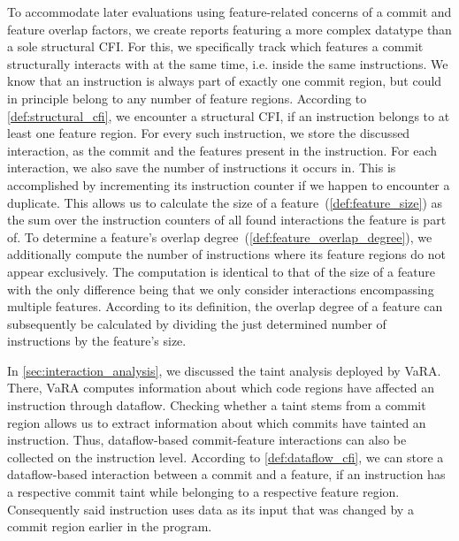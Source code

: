 To accommodate later evaluations using feature-related concerns of a commit and feature overlap factors, we create reports featuring a more complex datatype than a sole structural CFI.
For this, we specifically track which features a commit structurally interacts with at the same time, i.e. inside the same instructions.
We know that an instruction is always part of exactly one commit region, but could in principle belong to any number of feature regions.
According to \autoref{def:structural_cfi}, we encounter a structural CFI, if an instruction belongs to at least one feature region.
For every such instruction, we store the discussed interaction, as the commit and the features present in the instruction.
For each interaction, we also save the number of instructions it occurs in. 
This is accomplished by incrementing its instruction counter if we happen to encounter a duplicate. 
This allows us to calculate the size of a feature~(\autoref{def:feature_size}) as the sum over the instruction counters of all found interactions the feature is part of.
To determine a feature's overlap degree~(\autoref{def:feature_overlap_degree}), we additionally compute the number of instructions where its feature regions do not appear exclusively.
The computation is identical to that of the size of a feature with the only difference being that we only consider interactions encompassing multiple features.
According to its definition, the overlap degree of a feature can subsequently be calculated by dividing the just determined number of instructions by the feature's size.

In \autoref{sec:interaction_analysis}, we discussed the taint analysis deployed by VaRA.
There, VaRA computes information about which code regions have affected an instruction through dataflow.
Checking whether a taint stems from a commit region allows us to extract information about which commits have tainted an instruction.
Thus, dataflow-based commit-feature interactions can also be collected on the instruction level.
According to \autoref{def:dataflow_cfi}, we can store a dataflow-based interaction between a commit and a feature, if an instruction has a respective commit taint while belonging to a respective feature region.
Consequently said instruction uses data as its input that was changed by a commit region earlier in the program. 

\iffalse
For our research we examine numerous software projects to get a wide range of reference data, as commit-feature interactions could potentially vary greatly between different code spaces.
Accordingly, the VaRA-Tool-Suite was extended making it possible to generate a report comprising all found CFIs of an according type in a software project.
This aids us in examining several software projects to gain sufficient and sensible data about commit-feature interactions.
The created reports are also evaluated in the VaRA-Tool-Suite, which offers support to process and display statstics of the generated data. \\
\fi 

